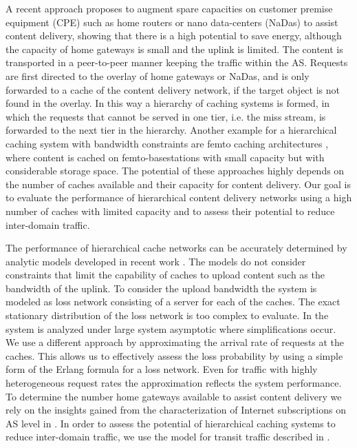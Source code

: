 A recent approach \cite{valancius2009greening} proposes to augment spare capacities on customer premise equipment (CPE) such as home routers or nano data-centers (NaDas) to assist content delivery, showing that there is a high potential to save energy, although the capacity of home gateways is small and the uplink is limited.
The content is transported in a peer-to-peer manner keeping the traffic within the AS.
Requests are first directed to the overlay of home gateways or NaDas, and is only forwarded to a cache of the content delivery network, if the target object is not found in the overlay.
In this way a hierarchy of caching systems is formed, in which the requests that cannot be served in one tier, i.e. the miss stream, is forwarded to the next tier in the hierarchy.
Another example for a hierarchical caching system with bandwidth constraints are femto caching architectures \cite{golrezaei2013femtocaching}, where content is cached on femto-basestations with small capacity but with considerable storage space.
The potential of these approaches highly depends on the number of caches available and their capacity for content delivery.
Our goal is to evaluate the performance of hierarchical content delivery networks using a high number of caches with limited capacity and to assess their potential to reduce inter-domain traffic.



The performance of hierarchical cache networks can be accurately determined by analytic models developed in recent work \cite{che2002hierarchical, martina2014unified}.
The models do not consider constraints that limit the capability of caches to upload content such as the bandwidth of the uplink.
To consider the upload bandwidth the system is modeled as loss network consisting of a server for each of the caches. The exact stationary distribution of the loss network is too complex to evaluate.
In \cite{tan2013optimal} the system is analyzed under large system asymptotic where simplifications occur.
We use a different approach by approximating the arrival rate of requests at the caches.
This allows us to effectively assess the loss probability by using a simple form of the Erlang formula for a loss network.
Even for traffic with highly heterogeneous request rates the approximation reflects the system performance.
To determine the number home gateways available to assist content delivery we rely on the insights gained from the characterization of Internet subscriptions on AS level in .
 In order to assess the potential of hierarchical caching systems to reduce inter-domain traffic, we use the model for transit traffic described in .

